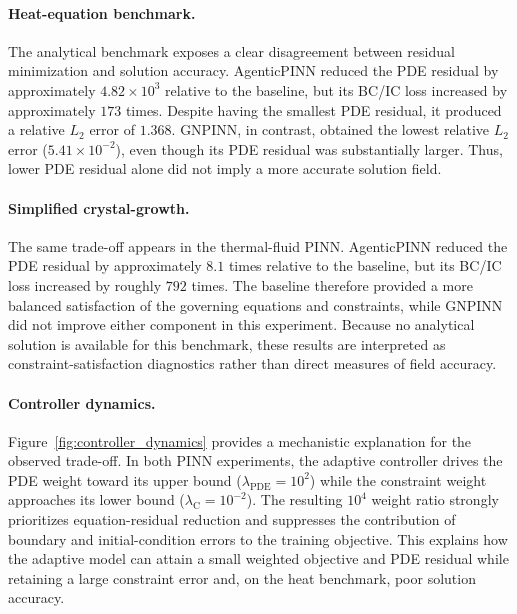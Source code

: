 \documentclass{article}
\begin{document}
\paragraph{Heat-equation benchmark.}
The analytical benchmark exposes a clear disagreement between residual minimization and solution accuracy. AgenticPINN reduced the PDE residual by approximately $4.82\times10^{3}$ relative to the baseline, but its BC/IC loss increased by approximately $173$ times. Despite having the smallest PDE residual, it produced a relative $L_2$ error of $1.368$. GNPINN, in contrast, obtained the lowest relative $L_2$ error ($5.41\times10^{-2}$), even though its PDE residual was substantially larger. Thus, lower PDE residual alone did not imply a more accurate solution field.

\paragraph{Simplified crystal-growth.}
The same trade-off appears in the thermal-fluid PINN. AgenticPINN reduced the PDE residual by approximately $8.1$ times relative to the baseline, but its BC/IC loss increased by roughly $792$ times. The baseline therefore provided a more balanced satisfaction of the governing equations and constraints, while GNPINN did not improve either component in this experiment. Because no analytical solution is available for this benchmark, these results are interpreted as constraint-satisfaction diagnostics rather than direct measures of field accuracy.


\paragraph{Controller dynamics.}
Figure~\ref{fig:controller_dynamics} provides a mechanistic explanation for the observed trade-off. In both PINN experiments, the adaptive controller drives the PDE weight toward its upper bound ($\lambda_{\mathrm{PDE}}=10^2$) while the constraint weight approaches its lower bound ($\lambda_{\mathrm{C}}=10^{-2}$). The resulting $10^4$ weight ratio strongly prioritizes equation-residual reduction and suppresses the contribution of boundary and initial-condition errors to the training objective. This explains how the adaptive model can attain a small weighted objective and PDE residual while retaining a large constraint error and, on the heat benchmark, poor solution accuracy.

\end{document}
